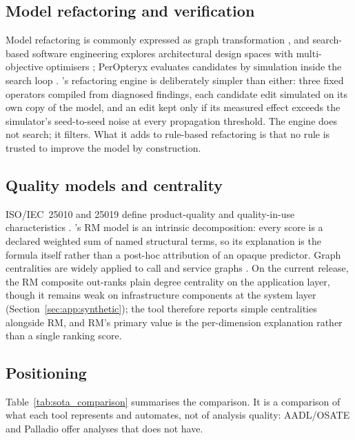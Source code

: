 \subsection{Model refactoring and verification}
\label{sec:related:refactoring}

Model refactoring is commonly expressed as graph transformation \citep{mens2006taxonomy}, and search-based software engineering explores architectural design spaces with multi-objective optimisers \citep{harman2012sbse, aleti2013software, deb2002fast}; PerOpteryx evaluates candidates by simulation inside the search loop \citep{koziolek2011peropteryx}. \sag{}'s refactoring engine is deliberately simpler than either: three fixed operators compiled from diagnosed findings, each candidate edit simulated on its own copy of the model, and an edit kept only if its measured effect exceeds the simulator's seed-to-seed noise at every propagation threshold. The engine does not search; it filters. What it adds to rule-based refactoring is that no rule is trusted to improve the model by construction.

\subsection{Quality models and centrality}
\label{sec:related:quality_models}

ISO/IEC~25010 and 25019 define product-quality and quality-in-use characteristics \citep{iso25010_2023, iso25019_2023}. \sag{}'s RM model is an intrinsic decomposition: every score is a declared weighted sum of named structural terms, so its explanation is the formula itself rather than a post-hoc attribution of an opaque predictor. Graph centralities are widely applied to call and service graphs \citep{freeman1977set, falci2018complex, bakhtin2025network}. On the current release, the RM composite out-ranks plain degree centrality on the application layer, though it remains weak on infrastructure components at the system layer (Section~\ref{sec:app:synthetic}); the tool therefore reports simple centralities alongside RM, and RM's primary value is the per-dimension explanation rather than a single ranking score.

\subsection{Positioning}
\label{sec:related:sota}

Table~\ref{tab:sota_comparison} summarises the comparison. It is a comparison of what each tool represents and automates, not of analysis quality: AADL/OSATE and Palladio offer analyses that \sag{} does not have.

